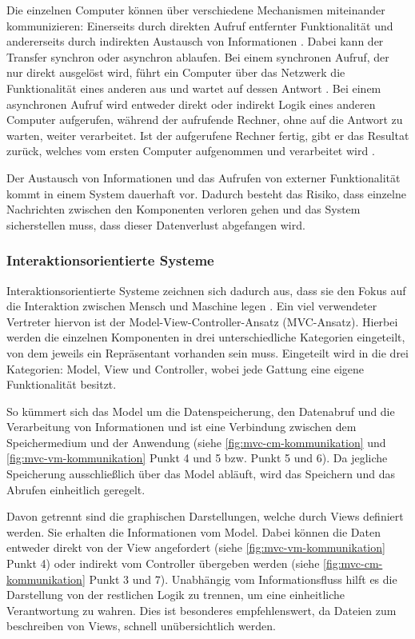 Die einzelnen Computer können über verschiedene Mechanismen miteinander kommunizieren: Einerseits durch direkten Aufruf entfernter Funktionalität und andererseits durch indirekten Austausch von Informationen \parencite[vgl.][S. 116]{starke_effektive_2015}. Dabei kann der Transfer synchron oder asynchron ablaufen. Bei einem synchronen Aufruf, der nur direkt ausgelöst wird, führt ein Computer über das Netzwerk die Funktionalität eines anderen aus und wartet auf dessen Antwort \parencite{synchrone_2018}.
Bei einem asynchronen Aufruf wird entweder direkt oder indirekt Logik eines anderen Computer aufgerufen, während der aufrufende Rechner, ohne auf die Antwort zu warten, weiter verarbeitet. Ist der aufgerufene Rechner fertig, gibt er das Resultat zurück, welches vom ersten Computer aufgenommen und verarbeitet wird \parencite{wiki_asynchrone_2019}.

Der Austausch von Informationen und das Aufrufen von externer Funktionalität kommt in einem System dauerhaft vor. Dadurch besteht das Risiko, dass einzelne Nachrichten zwischen den Komponenten verloren gehen und das System sicherstellen muss, dass dieser Datenverlust abgefangen wird.

\subsubsection{Interaktionsorientierte Systeme}
\label{sec:mvc}

Interaktionsorientierte Systeme zeichnen sich dadurch aus, dass sie den Fokus auf die Interaktion zwischen Mensch und Maschine legen \parencite[vgl.][S. 124]{starke_effektive_2015}.
Ein viel verwendeter Vertreter hiervon ist der Model-View-Controller-Ansatz (MVC-Ansatz). Hierbei werden die einzelnen Komponenten in drei unterschiedliche Kategorien eingeteilt, von dem jeweils ein Repräsentant vorhanden sein muss. Eingeteilt wird in die drei Kategorien: Model, View und Controller, wobei jede Gattung eine eigene Funktionalität besitzt.

So kümmert sich das Model um die Datenspeicherung, den Datenabruf und die Verarbeitung von Informationen und ist eine Verbindung zwischen dem Speichermedium und der Anwendung (siehe \cref{fig:mvc-cm-kommunikation} und \cref{fig:mvc-vm-kommunikation} Punkt 4 und 5 bzw. Punkt 5 und 6). Da jegliche Speicherung ausschließlich über das Model abläuft, wird das Speichern und das Abrufen einheitlich geregelt.

Davon getrennt sind die graphischen Darstellungen, welche durch Views definiert werden. Sie erhalten die Informationen vom Model. Dabei können die Daten entweder direkt von der View angefordert (siehe \cref{fig:mvc-vm-kommunikation} Punkt 4) oder indirekt vom Controller übergeben werden (siehe \cref{fig:mvc-cm-kommunikation} Punkt 3 und 7). Unabhängig vom Informationsfluss hilft es die Darstellung von der restlichen Logik zu trennen, um eine einheitliche Verantwortung zu wahren. Dies ist besonderes empfehlenswert, da Dateien zum beschreiben von Views, schnell unübersichtlich werden.

